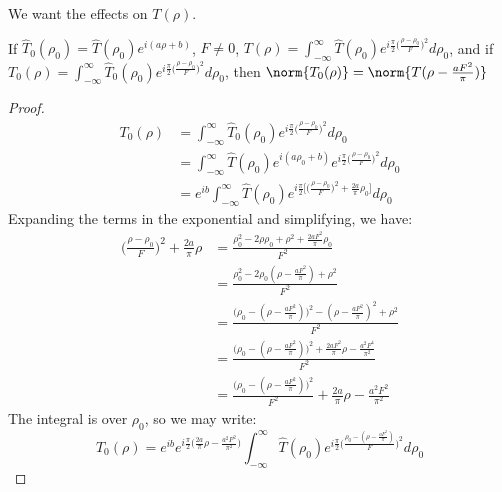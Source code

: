 \documentclass[crop=false,class=book,oneside]{standalone}
\begin{document}
            We want the effects on $T(\rho)$.
            \begin{theorem}
            If $\hat{T}_0(\rho_0) = \hat{T}(\rho_0)e^{i(a\rho+b)}$, $F\ne 0$, $T(\rho) = \int_{-\infty}^{\infty}\hat{T}(\rho_0)e^{i\frac{\pi}{2}\big(\frac{\rho-\rho_0}{F}\big)^2} d\rho_0$, and if $T_{0}(\rho) = \int_{-\infty}^{\infty}\hat{T}_{0}(\rho_0)e^{i\frac{\pi}{2}\big(\frac{\rho-\rho_0}{F}\big)^2} d\rho_0$, then $\norm{T_{0}(\rho)} = \norm{T(\rho - \frac{aF^2}{\pi})}$
            \end{theorem}
            \begin{proof}
            \begin{align*}
            T_0(\rho) &= \int_{-\infty}^{\infty} \hat{T}_{0}(\rho_0)e^{i\frac{\pi}{2}\big(\frac{\rho-\rho_0}{F}\big)^2}d\rho_0\\
            &=\int_{-\infty}^{\infty} \hat{T}(\rho_0)e^{i(a\rho_0+b)}e^{i\frac{\pi}{2}\big(\frac{\rho - \rho_0}{F}\big)^2}d\rho_0 \\
            	&= e^{ib}\int_{-\infty}^{\infty}\hat{T}(\rho_0)e^{i\frac{\pi}{2}\bigg[\big(\frac{\rho-\rho_0}{F}\big)^2 + \frac{2a}{\pi}\rho_0\bigg]}d\rho_0
            \end{align*}
            Expanding the terms in the exponential and simplifying, we have:
            \begin{align*}
                \big(\frac{\rho-\rho_0}{F}\big)^2 + \frac{2a}{\pi}\rho &= \frac{\rho_0^2 - 2\rho\rho_0 + \rho^2 + \frac{2aF^2}{\pi}\rho_0}{F^2}\\
                &= \frac{\rho_0^2 - 2\rho_0(\rho - \frac{aF^2}{\pi}) + \rho^2}{F^2}\\
                &= \frac{\big(\rho_0 - (\rho - \frac{aF^2}{\pi})\big)^2 - (\rho - \frac{aF^2}{\pi})^2 + \rho^2}{F^2}\\
                &= \frac{\big(\rho_0 - (\rho-\frac{aF^2}{\pi})\big)^2 +\frac{2aF^2}{\pi}\rho - \frac{a^2F^4}{\pi^2}}{F^2}\\
                &= \frac{\big(\rho_0 - (\rho-\frac{aF^2}{\pi})\big)^2}{F^2} + \frac{2a}{\pi}\rho - \frac{a^2F^2}{\pi^2}
            \end{align*}
            The integral is over $\rho_0$, so we may write:
            \begin{equation*}
            T_0(\rho) = e^{ib}e^{i\frac{\pi}{2}\big(\frac{2a}{\pi}\rho - \frac{a^2F^2}{\pi^2}\big)}\int_{-\infty}^{\infty} \hat{T}(\rho_0)e^{i\frac{\pi}{2}\big(\frac{\rho_0 - (\rho - \frac{aF^2}{\pi})}{F}\big)^2}d\rho_0
            \end{equation*}

\end{proof}
\end{document}
